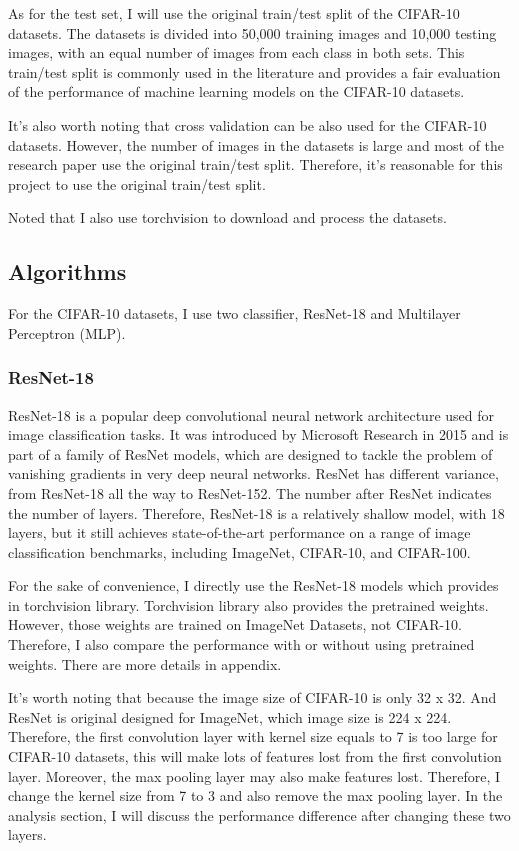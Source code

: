 \documentclass[twocolumn]{extarticle}
\begin{document}
As for the test set, I will use the original train/test split of the CIFAR-10 datasets. The datasets is divided into 50,000 training images and 10,000 testing images, with an equal number of images from each class in both sets. This train/test split is commonly used in the literature and provides a fair evaluation of the performance of machine learning models on the CIFAR-10 datasets.

It's also worth noting that cross validation can be also used for the CIFAR-10 datasets. However, the number of images in the datasets is large and most of the research paper use the original train/test split. Therefore, it's reasonable for this project to use the original train/test split.

Noted that I also use torchvision to download and process the datasets.

\subsection{Algorithms}

For the CIFAR-10 datasets, I use two classifier, ResNet-18 and Multilayer Perceptron (MLP).

\subsubsection{ResNet-18}

ResNet-18 is a popular deep convolutional neural network architecture used for image classification tasks. It was introduced by Microsoft Research in 2015 and is part of a family of ResNet models, which are designed to tackle the problem of vanishing gradients in very deep neural networks. ResNet has different variance, from ResNet-18 all the way to ResNet-152. The number after ResNet indicates the number of layers. Therefore, ResNet-18 is a relatively shallow model, with 18 layers, but it still achieves state-of-the-art performance on a range of image classification benchmarks, including ImageNet, CIFAR-10, and CIFAR-100.

For the sake of convenience, I directly use the ResNet-18 models which provides in torchvision library. Torchvision library also provides the pretrained weights. However, those weights are trained on ImageNet Datasets, not CIFAR-10. Therefore, I also compare the performance with or without using pretrained weights. There are more details in appendix.

It's worth noting that because the image size of CIFAR-10 is only 32 x 32. And ResNet is original designed for ImageNet, which image size is 224 x 224. Therefore, the first convolution layer with kernel size equals to 7 is too large for CIFAR-10 datasets, this will make lots of features lost from the first convolution layer. Moreover, the max pooling layer may also make features lost. Therefore, I change the kernel size from 7 to 3 and  also remove the max pooling layer. In the analysis section, I will discuss the performance difference after changing these two layers.
\end{document}
